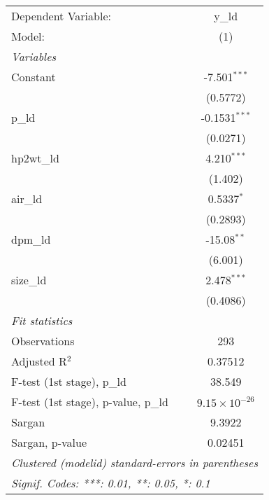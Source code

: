 
\begingroup
\centering
\begin{tabular}{lc}
   \tabularnewline \midrule \midrule
   Dependent Variable:                 & y\_ld\\   
   Model:                              & (1)\\  
   \midrule
   \emph{Variables}\\
   Constant                            & -7.501$^{***}$\\   
                                       & (0.5772)\\   
   p\_ld                               & -0.1531$^{***}$\\   
                                       & (0.0271)\\   
   hp2wt\_ld                           & 4.210$^{***}$\\   
                                       & (1.402)\\   
   air\_ld                             & 0.5337$^{*}$\\   
                                       & (0.2893)\\   
   dpm\_ld                             & -15.08$^{**}$\\   
                                       & (6.001)\\   
   size\_ld                            & 2.478$^{***}$\\   
                                       & (0.4086)\\   
   \midrule
   \emph{Fit statistics}\\
   Observations                        & 293\\  
   Adjusted R$^2$                      & 0.37512\\  
   F-test (1st stage), p\_ld           & 38.549\\  
   F-test (1st stage), p-value, p\_ld  & $9.15\times 10^{-26}$\\   
   Sargan                              & 9.3922\\  
   Sargan, p-value                     & 0.02451\\  
   \midrule \midrule
   \multicolumn{2}{l}{\emph{Clustered (modelid) standard-errors in parentheses}}\\
   \multicolumn{2}{l}{\emph{Signif. Codes: ***: 0.01, **: 0.05, *: 0.1}}\\
\end{tabular}
\par\endgroup


